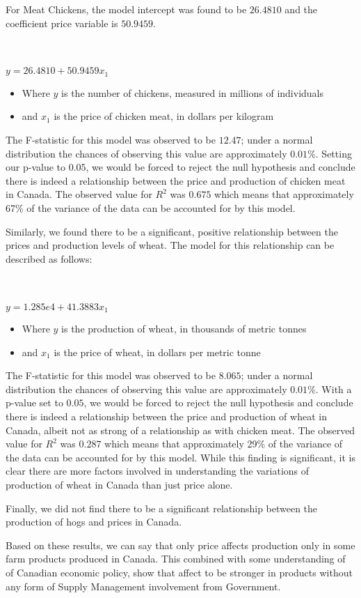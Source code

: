 For Meat Chickens, the model intercept was found to be $26.4810$ and the coefficient price variable is $50.9459$.

\\~\\

\tabto{5cm} $y = 26.4810 + 50.9459x_1$

\begin{itemize}
    \item Where $y$ is the number of chickens, measured in millions of individuals
    \item and $x_1$ is the price of chicken meat, in dollars per kilogram
\end{itemize}

The F-statistic for this model was observed to be $12.47$; under a normal distribution the chances of observing this value are approximately $0.01\%$.
Setting our p-value to $0.05$, we would be forced to reject the null hypothesis and conclude there is indeed a relationship between the price and production of chicken meat in Canada.
The observed value for $R^2$ was $0.675$ which means that approximately 67\% of the variance of the data can be accounted for by this model.

Similarly, we found there to be a significant, positive relationship between the prices and production levels of wheat.
The model for this relationship can be described as follows:

\\~\\

\tabto{5cm} $y = 1.285e4 + 41.3883x_1$

\begin{itemize}
    \item Where $y$ is the production of wheat, in thousands of metric tonnes
    \item and $x_1$ is the price of wheat, in dollars per metric tonne
\end{itemize}

The F-statistic for this model was observed to be $8.065$; under a normal distribution the chances of observing this value are approximately $0.01\%$.
With a p-value set to $0.05$, we would be forced to reject the null hypothesis and conclude there is indeed a relationship between the price and production of wheat in Canada, albeit not as strong of a relationship as with chicken meat.
The observed value for $R^2$ was $0.287$ which means that approximately 29\% of the variance of the data can be accounted for by this model.
While this finding is significant, it is clear there are more factors involved in understanding the variations of production of wheat in Canada than just price alone.

Finally, we did not find there to be a significant relationship between the production of hogs and prices in Canada.

Based on these results, we can say that only price affects production only in some farm products produced in Canada. This combined with some understanding of of Canadian economic policy, show that affect to be stronger in products without any form of Supply Management involvement from Government. 
